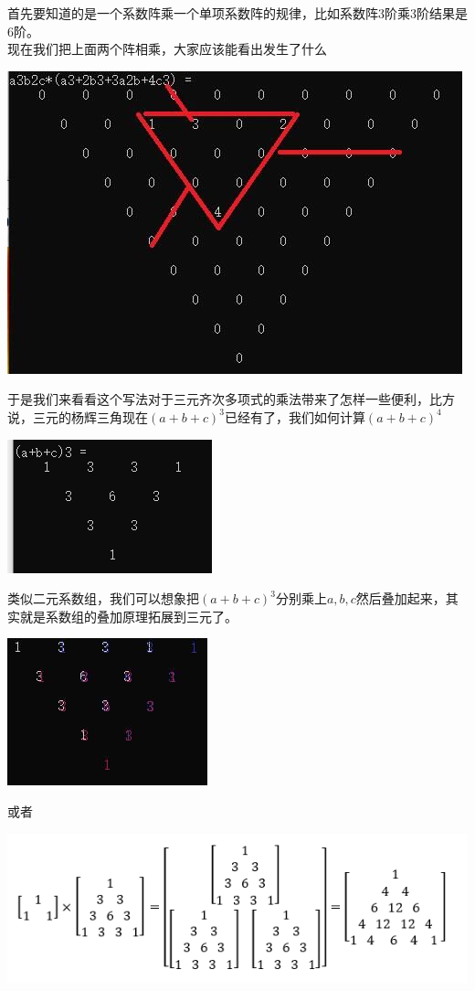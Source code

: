 \documentclass[UTF8]{ctexart}
\begin{document}
首先要知道的是一个系数阵乘一个单项系数阵的规律，比如系数阵$ 3 $阶乘$ 3 $阶结果是$ 6 $阶。\\
现在我们把上面两个阵相乘，大家应该能看出发生了什么
\begin{center}
	\includegraphics[width=0.7\linewidth]{03}
\end{center}
于是我们来看看这个写法对于三元齐次多项式的乘法带来了怎样一些便利，比方说，三元的杨辉三角现在$ (a+b+c)^{3} $已经有了，我们如何计算$ (a+b+c)^{4} $
\begin{center}
	\includegraphics[width=0.4\linewidth]{04}
\end{center}
类似二元系数组，我们可以想象把$ (a+b+c)^{3} $分别乘上$ a,b,c $然后叠加起来，其实就是系数组的叠加原理拓展到三元了。
\begin{center}
	\includegraphics[width=0.3\linewidth]{05}
\end{center}
或者
\begin{center}
	\includegraphics[width=0.6\linewidth]{06}
\end{center}
\end{document}
